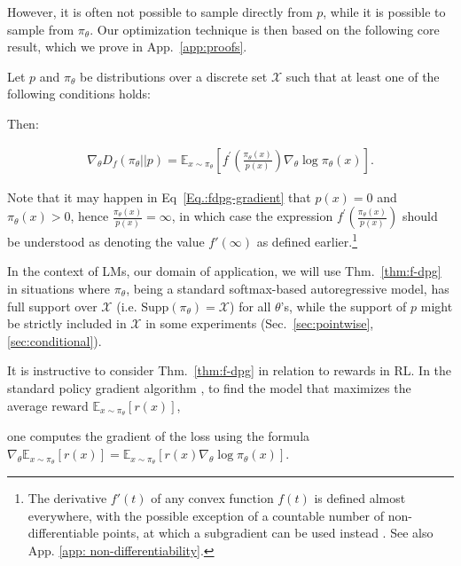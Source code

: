 However, it is often not possible to sample directly from $p$, while it is possible to sample from ${\pi_\theta}$. 
Our optimization technique is then based on the following core result, which we prove in App.~\ref{app:proofs}.

\begin{thm}\label{thm:f-dpg}
Let $p$ and ${\pi_\theta}$ be distributions over a discrete set $\mathcal{X}$ such that at least one of the following  conditions holds: 

Then:

\begin{align}
    \nabla_{\theta}D_{f}(\pi_{\theta}||p)=\mathbb{E}_{x\sim\pi_{\theta}}\left[f^{'}\left(\frac{\pi_{\theta}(x)}{p(x)}\right)\nabla_{\theta}\log\pi_{\theta}(x)\right].
\label{Eq.:fdpg-gradient}
\end{align}
\end{thm}

Note that it may happen in Eq~\ref{Eq.:fdpg-gradient} that $p(x) = 0$ and ${\pi_\theta}(x) > 0$, hence $\frac{{\pi_\theta}(x)}{p(x)} = \infty$, in which case the expression $f^{'}\left(\frac{\pi_{\theta}(x)}{p(x)}\right)$ should be understood as denoting the value $f'(\infty)$ as defined earlier.\footnote{

The derivative $f'(t)$ of any convex function $f(t)$ is defined almost everywhere, with the possible exception of a countable number of non-differentiable points, at which a subgradient can be used instead \cite{hiriart2013convex,rockafellar1970convex}. See also App. \ref{app: non-differentiability}.}

In the context of LMs, our domain of application, we will use Thm.~\ref{thm:f-dpg} in situations where ${\pi_\theta}$, being a standard softmax-based autoregressive model, has full support over $\mathcal{X}$ (i.e. ${\text{Supp}}({\pi_\theta})= \mathcal{X}$) for all $\theta$'s, while the support of $p$ might be strictly included in $\mathcal{X}$ in some experiments (Sec.~\ref{sec:pointwise}, \ref{sec:conditional}).

It is instructive to consider Thm.~\ref{thm:f-dpg} in relation to rewards in RL. In the standard policy gradient algorithm \cite{williams1992simple}, to find the model that maximizes the average reward $\mathbb{E}_{x\sim\pi_\theta}\left[r(x)\right]$, 

one computes the gradient of the loss using the formula
$\nabla_{\theta}\mathbb{E}_{x\sim\pi_\theta}\left[r(x)\right]=\mathbb{E}_{x\sim\pi_\theta}\left[r(x)\nabla_{\theta}\log\pi_{\theta}(x)\right]$. 

